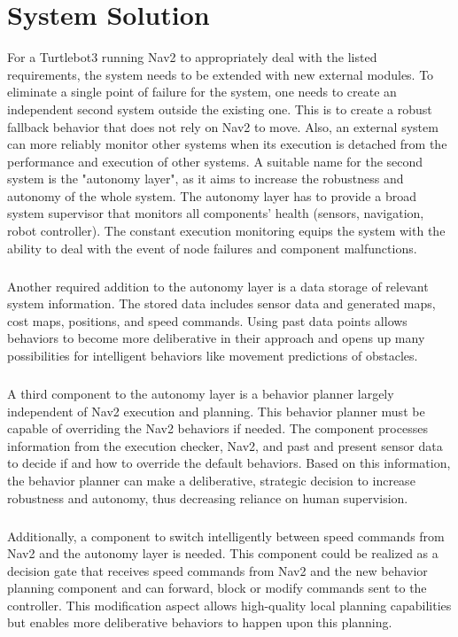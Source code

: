 \section{System Solution}

For a Turtlebot3 running Nav2 to appropriately deal with the listed requirements, the system needs to be extended with new external modules. To eliminate a single point of failure for the system, one needs to create an independent second system outside the existing one. This is to create a robust fallback behavior that does not rely on Nav2 to move. Also, an external system can more reliably monitor other systems when its execution is detached from the performance and execution of other systems. 
A suitable name for the second system is the "autonomy layer", as it aims to increase the robustness and autonomy of the whole system. 
The autonomy layer has to provide a broad system supervisor that monitors all components' health (sensors, navigation, robot controller). The constant execution monitoring equips the system with the ability to deal with the event of node failures and component malfunctions. 
\subparagraph*{}
Another required addition to the autonomy layer is a data storage of relevant system information. The stored data includes sensor data and generated maps, cost maps, positions, and speed commands. Using past data points allows behaviors to become more deliberative in their approach and opens up many possibilities for intelligent behaviors like movement predictions of obstacles. 
\subparagraph*{}
A third component to the autonomy layer is a behavior planner largely independent of Nav2 execution and planning. This behavior planner must be capable of overriding the Nav2 behaviors if needed. The component processes information from the execution checker, Nav2, and past and present sensor data to decide if and how to override the default behaviors. Based on this information, the behavior planner can make a deliberative, strategic decision to increase robustness and autonomy, thus decreasing reliance on human supervision.
\subparagraph*{}
Additionally, a component to switch intelligently between speed commands from Nav2 and the autonomy layer is needed. This component could be realized as a decision gate that receives speed commands from Nav2 and the new behavior planning component and can forward, block or modify commands sent to the controller. This modification aspect allows high-quality local planning capabilities but enables more deliberative behaviors to happen upon this planning.


